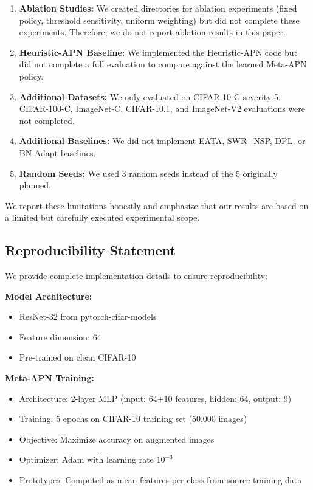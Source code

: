 \documentclass{article}
\begin{document}
\begin{enumerate}
    \item \textbf{Ablation Studies:} We created directories for ablation experiments (fixed policy, threshold sensitivity, uniform weighting) but did not complete these experiments. Therefore, we do not report ablation results in this paper.
    
    \item \textbf{Heuristic-APN Baseline:} We implemented the Heuristic-APN code but did not complete a full evaluation to compare against the learned Meta-APN policy.
    
    \item \textbf{Additional Datasets:} We only evaluated on CIFAR-10-C severity 5. CIFAR-100-C, ImageNet-C, CIFAR-10.1, and ImageNet-V2 evaluations were not completed.
    
    \item \textbf{Additional Baselines:} We did not implement EATA, SWR+NSP, DPL, or BN Adapt baselines.
    
    \item \textbf{Random Seeds:} We used 3 random seeds instead of the 5 originally planned.
\end{enumerate}

We report these limitations honestly and emphasize that our results are based on a limited but carefully executed experimental scope.

\subsection{Reproducibility Statement}

We provide complete implementation details to ensure reproducibility:

\textbf{Model Architecture:}
\begin{itemize}
    \item ResNet-32 from pytorch-cifar-models
    \item Feature dimension: 64
    \item Pre-trained on clean CIFAR-10
\end{itemize}

\textbf{Meta-APN Training:}
\begin{itemize}
    \item Architecture: 2-layer MLP (input: 64+10 features, hidden: 64, output: 9)
    \item Training: 5 epochs on CIFAR-10 training set (50,000 images)
    \item Objective: Maximize accuracy on augmented images
    \item Optimizer: Adam with learning rate $10^{-3}$
    \item Prototypes: Computed as mean features per class from source training data
\end{itemize}
\end{document}
